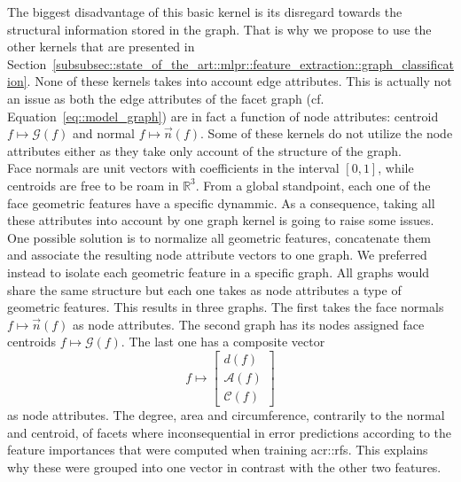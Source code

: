         The biggest disadvantage of this basic kernel is its disregard towards the structural information stored in the graph.
        That is why we propose to use the other kernels that are presented in Section~\ref{subsubsec::state_of_the_art::mlpr::feature_extraction::graph_classification}.
        None of these kernels takes into account edge attributes.
        This is actually not an issue as both the edge attributes of the facet graph (cf. Equation~\ref{eq::model_graph}) are in fact a function of node attributes: centroid \(f \mapsto \mathscr{G}\left(f\right)\) and normal \(f \mapsto \vec{n}\left(f\right)\).
        Some of these kernels do not utilize the node attributes either as they take only account of the structure of the graph.\\

        Face normals are unit vectors with coefficients in the interval \([0, 1]\), while centroids are free to be roam in \(\mathbb{R}^3\).
        From a global standpoint, each one of the face geometric features have a specific dynammic.
        As a consequence, taking all these attributes into account by one graph kernel is going to raise some issues.
        One possible solution is to normalize all geometric features, concatenate them and associate the resulting node attribute vectors to one graph.
        We preferred instead to isolate each geometric feature in a specific graph.
        All graphs would share the same structure but each one takes as node attributes a type of geometric features.
        This results in three graphs.
        The first takes the face normals \(f \mapsto \vec{n}\left(f\right)\) as node attributes.
        The second graph has its nodes assigned face centroids \(f \mapsto \mathscr{G}\left(f\right)\).
        The last one has a composite vector
        \begin{equation*}
            f \mapsto \begin{bmatrix}
                d\left(f\right)\\
                \mathscr{A}\left(f\right)\\
                \mathscr{C}\left(f\right)            
            \end{bmatrix}
        \end{equation*} as node attributes.
        The degree, area and circumference, contrarily to the normal and centroid, of facets where inconsequential in error predictions according to the feature importances that were computed when training \glspl{acr::rf}.
        This explains why these were grouped into one vector in contrast with the other two features.\\

